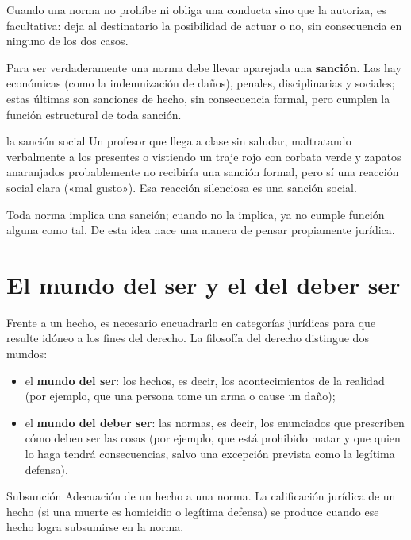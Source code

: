 \documentclass[12pt,oneside]{book}
\begin{document}
\begin{importante}
Cuando una norma no prohíbe ni obliga una conducta sino que la autoriza, es facultativa: deja al destinatario la posibilidad de actuar o no, sin consecuencia en ninguno de los dos casos.
\end{importante}

Para ser verdaderamente una norma debe llevar aparejada una \textbf{sanción}. Las hay económicas (como la indemnización de daños), penales, disciplinarias y sociales; estas últimas son sanciones de hecho, sin consecuencia formal, pero cumplen la función estructural de toda sanción.

\begin{ejemplo}{la sanción social}
Un profesor que llega a clase sin saludar, maltratando verbalmente a los presentes o vistiendo un traje rojo con corbata verde y zapatos anaranjados probablemente no recibiría una sanción formal, pero sí una reacción social clara («mal gusto»). Esa reacción silenciosa es una sanción social.
\end{ejemplo}

\begin{importante}
Toda norma implica una sanción; cuando no la implica, ya no cumple función alguna como tal. De esta idea nace una manera de pensar propiamente jurídica.
\end{importante}

\section{El mundo del ser y el del deber ser}

Frente a un hecho, es necesario encuadrarlo en categorías jurídicas para que resulte idóneo a los fines del derecho. La filosofía del derecho distingue dos mundos:

\begin{itemize}
\item el \textbf{mundo del ser}: los hechos, es decir, los acontecimientos de la realidad (por ejemplo, que una persona tome un arma o cause un daño);
\item el \textbf{mundo del deber ser}: las normas, es decir, los enunciados que prescriben cómo deben ser las cosas (por ejemplo, que está prohibido matar y que quien lo haga tendrá consecuencias, salvo una excepción prevista como la legítima defensa).
\end{itemize}

\begin{definicion}{Subsunción}
Adecuación de un hecho a una norma. La calificación jurídica de un hecho (si una muerte es homicidio o legítima defensa) se produce cuando ese hecho logra subsumirse en la norma.
\end{definicion}
\end{document}
